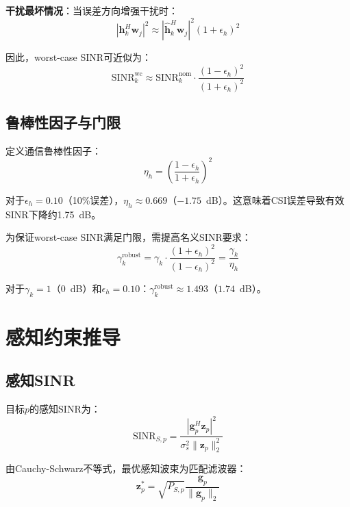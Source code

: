 \documentclass[12pt,a4paper]{article}
\newcommand{\vect}[1]{\mathbf{#1}}
\newcommand{\norm}[1]{\|#1\|_2}
\begin{document}
\textbf{干扰最坏情况}：当误差方向增强干扰时：
\begin{equation}
|\vect{h}_k^H \vect{w}_j|^2 \approx |\hat{\vect{h}}_k^H \vect{w}_j|^2 (1 + \epsilon_h)^2
\end{equation}

因此，worst-case SINR可近似为：
\begin{equation}
\text{SINR}_k^{\text{wc}} \approx \text{SINR}_k^{\text{nom}} \cdot \frac{(1-\epsilon_h)^2}{(1+\epsilon_h)^2} \tag{2}
\end{equation}

\subsection{鲁棒性因子与门限}

定义通信鲁棒性因子：
\begin{equation}
\eta_h = \left(\frac{1-\epsilon_h}{1+\epsilon_h}\right)^2 \tag{3}
\end{equation}

对于$\epsilon_h = 0.10$（10\%误差），$\eta_h \approx 0.669$（$-1.75$~dB）。这意味着CSI误差导致有效SINR下降约1.75~dB。

为保证worst-case SINR满足门限，需提高名义SINR要求：
\begin{equation}
\gamma_k^{\text{robust}} = \gamma_k \cdot \frac{(1+\epsilon_h)^2}{(1-\epsilon_h)^2} = \frac{\gamma_k}{\eta_h} \tag{4}
\end{equation}

对于$\gamma_k = 1$（0~dB）和$\epsilon_h = 0.10$：$\gamma_k^{\text{robust}} \approx 1.493$（$1.74$~dB）。

\section{感知约束推导}

\subsection{感知SINR}

目标$p$的感知SINR为：
\begin{equation}
\text{SINR}_{S,p} = \frac{|\vect{g}_p^H \vect{z}_p|^2}{\sigma_s^2 \norm{\vect{z}_p}^2} \tag{5}
\end{equation}

由Cauchy-Schwarz不等式，最优感知波束为匹配滤波器：
\begin{equation}
\vect{z}_p^* = \sqrt{P_{S,p}} \frac{\vect{g}_p}{\norm{\vect{g}_p}} \tag{6}
\end{equation}
\end{document}
